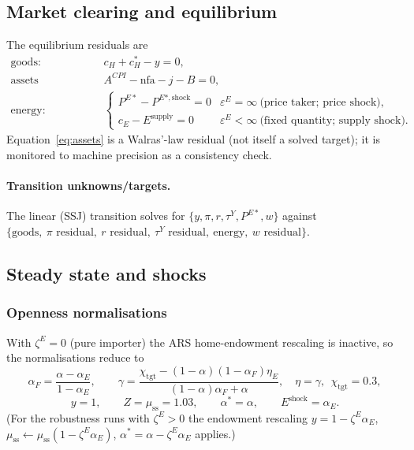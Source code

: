 \documentclass[11pt,a4paper]{article}
\newcommand{\stst}{\mathrm{ss}}
\begin{document}
\subsection{Market clearing and equilibrium}\label{sec:clearing}

The equilibrium residuals are
\begin{align}
\text{goods:}&\quad c_H+c_H^{*}-y=0, \label{eq:goods}\\
\text{assets (Walras):}&\quad A^{CPI}-\mathrm{nfa}-j-B=0, \label{eq:assets}\\
\text{energy:}&\quad
\begin{cases}
P^{E*}-P^{E*,\text{shock}}=0 & \varepsilon^{E}=\infty\ \text{(price taker; price shock)},\\
c_E-E^{\text{supply}}=0 & \varepsilon^{E}<\infty\ \text{(fixed quantity; supply shock).}
\end{cases}\label{eq:energy}
\end{align}
Equation~\eqref{eq:assets} is a Walras'-law residual (not itself a solved
target); it is monitored to machine precision as a consistency check.

\paragraph{Transition unknowns/targets.} The linear (SSJ) transition solves for
$\{y,\pi,r,\tau^{Y},P^{E*},w\}$ against
$\{\text{goods},\ \pi\text{ residual},\ r\text{ residual},\ \tau^{Y}\text{ residual},
\ \text{energy},\ w\text{ residual}\}$.

\subsection{Steady state and shocks}\label{sec:ss}

\subsubsection{Openness normalisations}

With $\zeta^{E}=0$ (pure importer) the ARS home-endowment rescaling is inactive,
so the normalisations reduce to
\begin{equation}
\alpha_F=\frac{\alpha-\alpha_E}{1-\alpha_E},\qquad
\gamma=\frac{\chi_{\text{tgt}}-(1-\alpha)(1-\alpha_F)\eta_E}{(1-\alpha)\alpha_F+\alpha},\quad \eta=\gamma,\ \ \chi_{\text{tgt}}=0.3,
\end{equation}
\begin{equation}
y=1,\qquad Z=\mu_{\stst}=1.03,\qquad \alpha^{*}=\alpha,\qquad E^{\text{shock}}=\alpha_E .
\end{equation}
(For the robustness runs with $\zeta^{E}>0$ the endowment rescaling
$y=1-\zeta^{E}\alpha_E$, $\mu_{\stst}\leftarrow\mu_{\stst}(1-\zeta^{E}\alpha_E)$,
$\alpha^{*}=\alpha-\zeta^{E}\alpha_E$ applies.)
\end{document}
